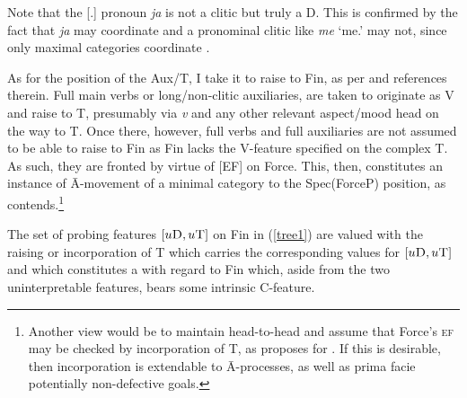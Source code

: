 \documentclass[output=paper]{langsci/langscibook}
\begin{document}
Note that the [\Fsg.\Nom{}] pronoun \emph{ja} is not a clitic but truly a
D. This is confirmed by the fact that \emph{ja} may
coordinate and a pronominal clitic like \emph{me} `me.\Acc{}' may
not, since only maximal categories coordinate \citep{Kayne1994}.

As for the position of the Aux/T, I take it to raise to
Fin, as per \citet[396]{roberts:2012uq} and references
therein. Full main verbs or long/non-clitic auxiliaries, are taken to originate
as V and raise to T, presumably via
\emph{v} and any other relevant aspect/mood head on the way to
T. Once there, however, full verbs and full auxiliaries
are not assumed to be able to raise to Fin as
Fin lacks the V-feature specified on the complex
T. As such, they are fronted by virtue of [\gls{EF}] on
Force. This, then, constitutes an instance of Ā-movement
of a minimal category to the Spec(ForceP) position, as
\citet[396]{roberts:2012uq} contends.\footnote{Another view would be to
maintain head-to-head  and assume that Force's \textsc{ef} may be
checked by incorporation of T, as \citet{roberts:2012uq}
proposes for . If this is desirable, then incorporation is
extendable to Ā-processes, as well as prima facie potentially
non-defective goals.}

The set of probing features $[u\textsc{D},u\textsc{T}]$ on Fin in
(\ref{tree1}) are valued with the raising or incorporation of T which
carries the corresponding values for $[u\textsc{D},u\textsc{T}]$ and which
constitutes a  with regard to Fin which, aside
from the two uninterpretable features, bears some intrinsic C-feature.
\end{document}
